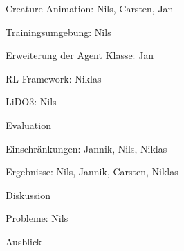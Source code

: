 \begin{thallok}
\begin{thallok}
		\item Creature Animation: Nils, Carsten, Jan
		\begin{thallok}
			\item Trainingsumgebung: Nils
			\item Erweiterung der Agent Klasse: Jan
			\item RL-Framework: Niklas
			\item LiDO3: Nils
		\end{thallok}
	\end{thallok}
	\item Evaluation
	\begin{thallok}
		\item Einschränkungen: Jannik, Nils, Niklas
		\item Ergebnisse: Nils, Jannik, Carsten, Niklas
		\item Diskussion
		\item Probleme: Nils
	\end{thallok}
	\item Ausblick
\end{thallok}

